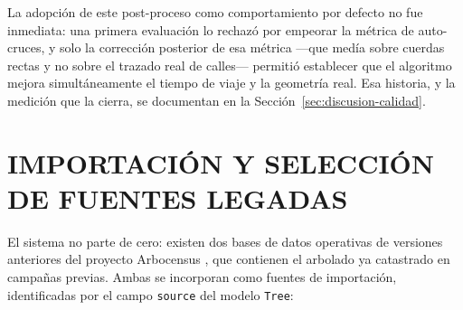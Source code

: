 La adopción de este post-proceso como comportamiento por defecto no fue inmediata:
una primera evaluación lo rechazó por empeorar la métrica de auto-cruces, y solo la
corrección posterior de esa métrica ---que medía sobre cuerdas rectas y no sobre el
trazado real de calles--- permitió establecer que el algoritmo mejora
simultáneamente el tiempo de viaje y la geometría real. Esa historia, y la medición
que la cierra, se documentan en la Sección~\ref{sec:discusion-calidad}.

\section{IMPORTACIÓN Y SELECCIÓN DE FUENTES LEGADAS}
\label{sec:legacy}

El sistema no parte de cero: existen dos bases de datos operativas de versiones
anteriores del proyecto Arbocensus
\citep{binder-cortes2023,pizarro2024}, que contienen el arbolado ya catastrado
en campañas previas. Ambas se incorporan como fuentes de importación, identificadas por
el campo \texttt{source} del modelo \texttt{Tree}:

